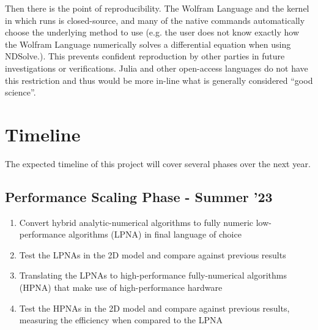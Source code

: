 \documentclass{article}
\begin{document}
                Then there is the point of reproducibility.  The Wolfram Language and the kernel in which runs is closed-source, and many of the native commands automatically choose the underlying method to use (e.g. the user does not know exactly how the Wolfram Language numerically solves a differential equation when using NDSolve.).  This prevents confident reproduction by other parties in future investigations or verifications.  Julia and other open-access languages do not have this restriction and thus would be more in-line what is generally considered ``good science''.
    
    \section{Timeline}

        The expected timeline of this project will cover several phases over the next year.

        \subsection{Performance Scaling Phase - Summer '23}
        
            \begin{enumerate}
                \item Convert hybrid analytic-numerical algorithms to fully numeric low-performance algorithms (LPNA) in final language of choice
                \item Test the LPNAs in the 2D model and compare against previous results\cite{Jain}
                \item Translating the LPNAs to high-performance fully-numerical algorithms (HPNA) that make use of high-performance hardware
                \item Test the HPNAs in the 2D model and compare against previous results, measuring the efficiency when compared to the LPNA
            \end{enumerate}
\end{document}
